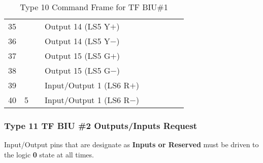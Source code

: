 \documentclass[]{article}
\begin{document}
\begin{landscape}
\begin{table}[ht]
\begin{tabular}{lllllllll}
			35           &                     &                    & Output 14 (LS5 Y$+$)           &                    & \cellcolor[HTML]{C0C0C0} & \cellcolor[HTML]{C0C0C0}                   & \cellcolor[HTML]{C0C0C0}                   & \cellcolor[HTML]{C0C0C0}               \\
			36           &                     &                    & Output 14 (LS5 Y$-$)           &                    & \cellcolor[HTML]{C0C0C0} & \cellcolor[HTML]{C0C0C0}                   & \cellcolor[HTML]{C0C0C0}                   & \cellcolor[HTML]{C0C0C0}               \\
			37           &                     &                    & Output 15 (LS5 G$+$)           &                    & \cellcolor[HTML]{C0C0C0} & \cellcolor[HTML]{C0C0C0}                   & \cellcolor[HTML]{C0C0C0}                   & \cellcolor[HTML]{C0C0C0}               \\
			38           &                     &                    & Output 15 (LS5 G$-$)           &                    & \cellcolor[HTML]{C0C0C0} & \cellcolor[HTML]{C0C0C0}                   & \cellcolor[HTML]{C0C0C0}                   & \cellcolor[HTML]{C0C0C0}               \\
			39           &                     &                    & Input/Output 1 (LS6 R$+$)      &                    & \cellcolor[HTML]{C0C0C0} & \cellcolor[HTML]{C0C0C0}                   & \cellcolor[HTML]{C0C0C0}                   & \cellcolor[HTML]{C0C0C0}               \\
			40           & \multirow{-8}{*}{5} & \multirow{-8}{*}{} & Input/Output 1 (LS6 R$-$)      &                    & \cellcolor[HTML]{C0C0C0} & \multirow{-8}{*}{\cellcolor[HTML]{C0C0C0}} & \multirow{-8}{*}{\cellcolor[HTML]{C0C0C0}} & \cellcolor[HTML]{C0C0C0}               \\ \cline{1-4} \cline{6-9} 
		\end{tabular}%

	\caption{Type 10 Command Frame for TF BIU\#1}
	\label{tab:type-10-frame}
\end{table}
\end{landscape}

\clearpage
\subsubsection {Type 11 TF BIU \#2 Outputs/Inputs Request}

Input/Output pins that are designate as \textbf{Inputs or Reserved} must be driven to the logic \textbf{0} state at all times.
\end{document}
